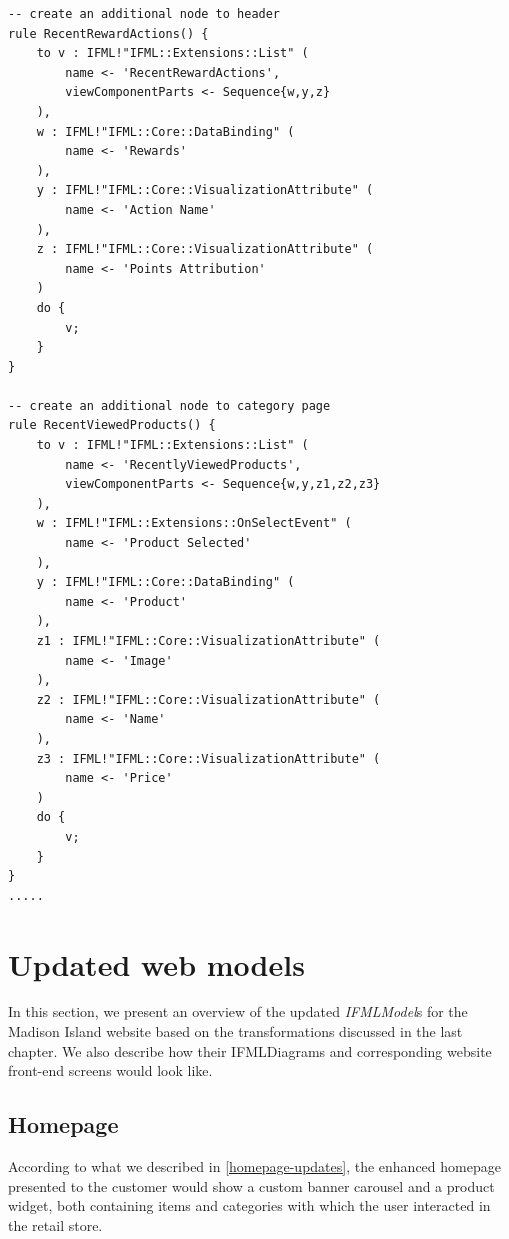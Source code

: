 \begin{lstlisting}[breaklines,style=AMMA,language=ATL,mathescape,rulesepcolor=\color{black},caption={ A fragment of the transformation},captionpos=b, aboveskip=0.2cm, belowskip=0cm, label={lst:IFMLRUD2IFML}]
-- create an additional node to header
rule RecentRewardActions() {
	to v : IFML!"IFML::Extensions::List" (
		name <- 'RecentRewardActions',
		viewComponentParts <- Sequence{w,y,z}
	),
	w : IFML!"IFML::Core::DataBinding" (
		name <- 'Rewards'
	),
	y : IFML!"IFML::Core::VisualizationAttribute" (
		name <- 'Action Name'
	),
	z : IFML!"IFML::Core::VisualizationAttribute" (
		name <- 'Points Attribution'
	)
	do {
		v;
	}
}

-- create an additional node to category page
rule RecentViewedProducts() {
	to v : IFML!"IFML::Extensions::List" (
		name <- 'RecentlyViewedProducts',
		viewComponentParts <- Sequence{w,y,z1,z2,z3}
	),
	w : IFML!"IFML::Extensions::OnSelectEvent" (
		name <- 'Product Selected'
	),
	y : IFML!"IFML::Core::DataBinding" (
		name <- 'Product'
	),
	z1 : IFML!"IFML::Core::VisualizationAttribute" (
		name <- 'Image'
	),
	z2 : IFML!"IFML::Core::VisualizationAttribute" (
		name <- 'Name'
	),
	z3 : IFML!"IFML::Core::VisualizationAttribute" (
		name <- 'Price'
	)
	do {
		v;
	}
}
.....
\end{lstlisting}
\vspace{0.5cm}


\newpage
\section{Updated web models}

In this section, we present an overview of the updated \textit{IFMLModel}s for the Madison Island website based on the transformations discussed in the last chapter. We also describe how their IFMLDiagrams and corresponding website front-end screens would look like.

\subsection{Homepage}

According to what we described in \ref{homepage-updates}, the enhanced homepage presented to the customer would show a custom banner carousel and a product widget, both containing items and categories with which the user interacted in the retail store.


